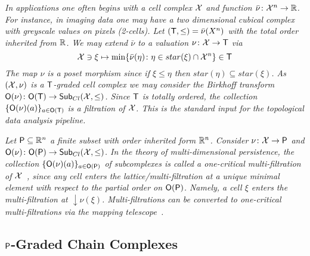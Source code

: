 \begin{ex}\label{ex:filt}
{\em
In applications one often begins with a cell complex ${\mathcal X}$ and function $\bar \nu\colon {\mathcal X}^n\to {\mathbb{R}}$.  For instance, in imaging data one may have a two dimensional cubical complex with greyscale values on pixels (2-cells). Let $({\mathsf T},\leq)=\bar \nu(X^n)$ with the total order inherited from ${\mathbb{R}}$. We may extend $\bar \nu$ to a valuation $\nu\colon {\mathcal X}\to {\mathsf T}$ via
\[
{\mathcal X}\ni \xi \mapsto \min\{\bar \nu (\eta )\colon  \eta \in star(\xi)\cap {\mathcal X}^n\} \in {\mathsf T}
\]
The map $\nu$ is a poset morphism since if $\xi \leq \eta$ then $star(\eta)\subseteq star(\xi)$.   As $({\mathcal X},\nu)$ is a ${\mathsf T}$-graded cell complex we may consider the Birkhoff transform ${\mathsf O}(\nu)\colon {\mathsf O}({\mathsf T})\to {\mathsf {\mathsf{Sub}}}_{Cl}({\mathcal X},\leq)$.  Since ${\mathsf T}$ is totally ordered, the collection $\{{\mathsf O}(\nu)(a)\}_{a\in {\mathsf O}({\mathsf T})}$ is a filtration of ${\mathcal X}$.  This is the standard input for the topological data analysis pipeline.
}
\end{ex}

\begin{ex}
{\em 
Let ${\mathsf P}\subseteq {\mathbb{R}}^n$ a finite subset with order inherited form ${\mathbb{R}}^n$.  Consider $\nu\colon {\mathcal X}\to {\mathsf P}$ and ${\mathsf O}(\nu)\colon {\mathsf O}({\mathsf P})\to \mathsf{Sub}_{Cl}({\mathcal X},\leq)$.  In the theory of multi-dimensional persistence, the collection $\{{\mathsf O}(\nu)(a)\}_{a\in {\mathsf O}({\mathsf P})}$ of subcomplexes is called a {\em one-critical multi-filtration} of ${\mathcal X}$~\cite{csz}, since any cell enters the lattice/multi-filtration at a unique minimal element with respect to the partial order on ${\mathsf O}({\mathsf P})$.  Namely, a cell $\xi$ enters the multi-filtration at $\downarrow \nu(\xi)$.  Multi-filtrations can be converted to one-critical multi-filtrations via the mapping telescope~\cite{csz}.
 }
\end{ex}

%
%


\subsection{${\mathsf P}$-Graded Chain Complexes}\label{sec:grad:chain}


